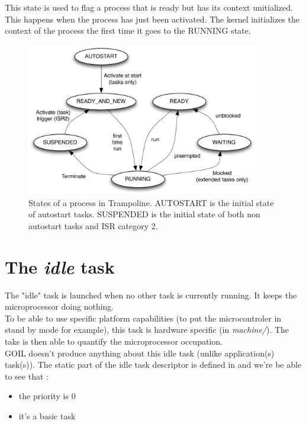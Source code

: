 This state is used to flag a process that is ready but has its context unitialized. This happens when the process has just been activated. The kernel initializes the context of the process the first time it goes to the RUNNING state.

\begin{figure}[htbp] %
   \centering
   \includegraphics[width=4in]{pictures/states.pdf} 
   \caption{States of a process in Trampoline. AUTOSTART is the initial state of autostart tasks. SUSPENDED is the initial state of both non autostart tasks and ISR category 2.}
   \label{fig:states}
\end{figure} 


\section{The {\em idle} task}

The "idle" task is launched when no other task is currently running. It keeps the microprocessor doing nothing.\\
To be able to use specific platform capabilities (to put the microcontroler in stand by mode for example), this task is hardware specific (in \textit{machine/}). The taks is then able to quantify the microprocessor occupation.\\
GOIL doesn't produce anything about this idle task (unlike application(s) task(s)). The static part of the idle task descriptor is defined in  and we're be able to see that :
\begin{itemize}
\item the priority is 0
\item it's a basic task
\end{itemize}
